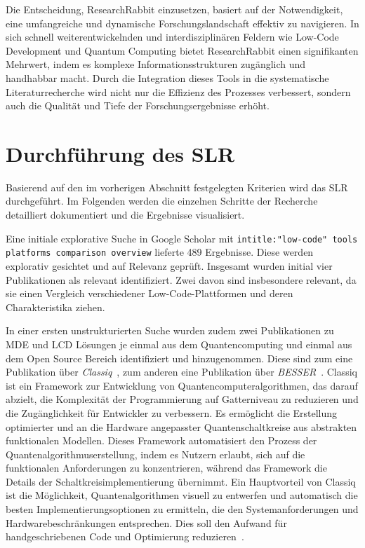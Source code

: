 Die Entscheidung, ResearchRabbit einzusetzen, basiert auf der Notwendigkeit, eine umfangreiche und 
dynamische Forschungslandschaft effektiv zu navigieren. In sich schnell weiterentwickelnden und interdisziplinären 
Feldern wie Low-Code Development und Quantum Computing bietet ResearchRabbit einen signifikanten Mehrwert, 
indem es komplexe Informationsstrukturen zugänglich und handhabbar macht. Durch die Integration dieses Tools 
in die systematische Literaturrecherche wird nicht nur die Effizienz des Prozesses verbessert, sondern auch 
die Qualität und Tiefe der Forschungsergebnisse erhöht.

\section{Durchführung des SLR}
Basierend auf den im vorherigen Abschnitt festgelegten Kriterien wird das SLR
durchgeführt. Im Folgenden werden die einzelnen Schritte der Recherche detailliert dokumentiert und die Ergebnisse 
visualisiert. 


Eine initiale explorative Suche in Google Scholar mit \texttt{intitle:"low-code" tools platforms comparison overview} lieferte 489 
Ergebnisse. Diese werden explorativ gesichtet und auf Relevanz geprüft. Insgesamt wurden initial vier Publikationen 
als relevant identifiziert. Zwei davon sind insbesondere relevant, da sie einen Vergleich verschiedener 
Low-Code-Plattformen und deren Charakteristika ziehen. 

In einer ersten unstrukturierten Suche wurden zudem zwei Publikationen zu MDE und LCD Lösungen je einmal aus dem Quantencomputing und 
einmal aus dem Open Source Bereich identifiziert und hinzugenommen. Diese sind zum eine Publikation über \textit{Classiq}~\cite{minerbi2022quantum}, zum anderen 
eine Publikation über \textit{BESSER}~\cite{alfonso2024building}. 
Classiq ist ein Framework zur Entwicklung von Quantencomputeralgorithmen, das darauf abzielt, die Komplexität der Programmierung 
auf Gatterniveau zu reduzieren und die Zugänglichkeit für Entwickler zu verbessern. Es ermöglicht die Erstellung optimierter und 
an die Hardware angepasster Quantenschaltkreise aus abstrakten funktionalen Modellen. Dieses Framework automatisiert den Prozess der 
Quantenalgorithmuserstellung, indem es Nutzern erlaubt, sich auf die funktionalen Anforderungen zu konzentrieren, während das Framework 
die Details der Schaltkreisimplementierung übernimmt. Ein Hauptvorteil von Classiq ist die Möglichkeit, Quantenalgorithmen visuell zu 
entwerfen und automatisch die besten Implementierungsoptionen 
zu ermitteln, die den Systemanforderungen und Hardwarebeschränkungen entsprechen. Dies soll den Aufwand für handgeschriebenen Code und 
Optimierung reduzieren~\cite{minerbi2022quantum}. 

